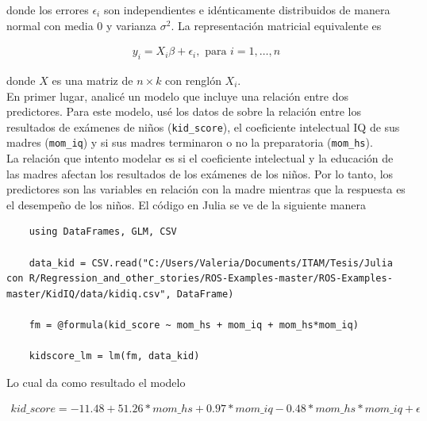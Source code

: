 donde los errores $\epsilon_i$ son independientes e idénticamente distribuidos de manera normal con media 0 y varianza $\sigma^2$. La representación matricial equivalente es 

\begin{equation*}
    \begin{aligned}
        y_i = X_i \beta + \epsilon_i, \text{ para } i = 1, \dots, n
    \end{aligned}
\end{equation*}

donde $X$ es una matriz de $n \times k$ con renglón $X_i$.
\\
En primer lugar, analicé un modelo que incluye una relación entre dos predictores. Para este modelo, usé los datos de \citep{regression_other_stories} sobre la relación entre los resultados de exámenes de niños (\texttt{kid\_score}), el coeficiente intelectual IQ de sus madres (\texttt{mom\_iq}) y si sus madres terminaron o no la preparatoria (\texttt{mom\_hs}). 
\\
La relación que intento modelar es si el coeficiente intelectual y la educación de las madres afectan los resultados de los exámenes de los niños. Por lo tanto, los predictores son las variables en relación con la madre mientras que la respuesta es el desempeño de los niños. El código en Julia se ve de la siguiente manera

\begin{verbatim}
    using DataFrames, GLM, CSV

    data_kid = CSV.read("C:/Users/Valeria/Documents/ITAM/Tesis/Julia con R/Regression_and_other_stories/ROS-Examples-master/ROS-Examples-master/KidIQ/data/kidiq.csv", DataFrame)

    fm = @formula(kid_score ~ mom_hs + mom_iq + mom_hs*mom_iq)

    kidscore_lm = lm(fm, data_kid)
\end{verbatim}

Lo cual da como resultado el modelo 


\begin{equation*}
    \begin{aligned}
        kid\_score = -11.48 + 51.26* mom\_hs + 0.97*mom\_iq -0.48*mom\_hs*mom\_iq + \epsilon
    \end{aligned}
\end{equation*}

